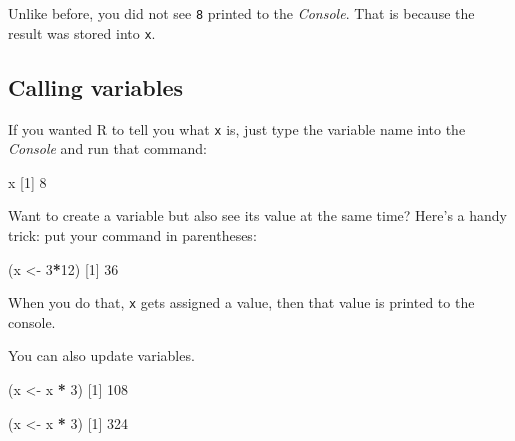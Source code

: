 \documentclass[]{book}
\newenvironment{Shaded}{\begin{snugshade}}{\end{snugshade}}
\newcommand{\DecValTok}[1]{\textcolor[rgb]{0.00,0.00,0.81}{#1}}
\newcommand{\NormalTok}[1]{#1}
\newcommand{\OperatorTok}[1]{\textcolor[rgb]{0.81,0.36,0.00}{\textbf{#1}}}
\newcommand{\StringTok}[1]{\textcolor[rgb]{0.31,0.60,0.02}{#1}}
\begin{document}
Unlike before, you did not see \texttt{8} printed to the \emph{Console}. That is because the result was stored into \texttt{x}.

\hypertarget{calling-variables}{%
\subsection*{Calling variables}\label{calling-variables}}

If you wanted R to tell you what \texttt{x} is, just type the variable name into the \emph{Console} and run that command:

\begin{Shaded}
\begin{Highlighting}[]
\NormalTok{x}
\NormalTok{[}\DecValTok{1}\NormalTok{] }\DecValTok{8}
\end{Highlighting}
\end{Shaded}

Want to create a variable but also see its value at the same time? Here's a handy trick: put your command in parentheses:

\begin{Shaded}
\begin{Highlighting}[]
\NormalTok{(x <-}\StringTok{ }\DecValTok{3}\OperatorTok{*}\DecValTok{12}\NormalTok{)}
\NormalTok{[}\DecValTok{1}\NormalTok{] }\DecValTok{36}
\end{Highlighting}
\end{Shaded}

When you do that, \texttt{x} gets assigned a value, then that value is printed to the console.

You can also update variables.

\begin{Shaded}
\begin{Highlighting}[]
\NormalTok{(x <-}\StringTok{ }\NormalTok{x }\OperatorTok{*}\StringTok{ }\DecValTok{3}\NormalTok{)}
\NormalTok{[}\DecValTok{1}\NormalTok{] }\DecValTok{108}
\end{Highlighting}
\end{Shaded}

\begin{Shaded}
\begin{Highlighting}[]
\NormalTok{(x <-}\StringTok{ }\NormalTok{x }\OperatorTok{*}\StringTok{ }\DecValTok{3}\NormalTok{)}
\NormalTok{[}\DecValTok{1}\NormalTok{] }\DecValTok{324}
\end{Highlighting}
\end{Shaded}
\end{document}
